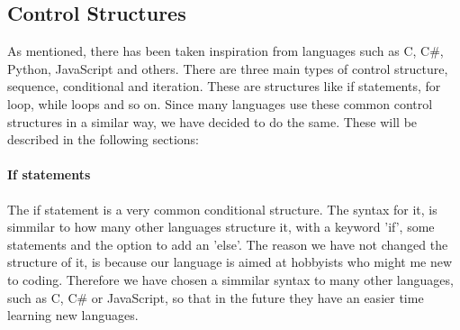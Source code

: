 \subsection{Control Structures}
As mentioned, there has been taken inspiration from languages such as C, C\#, Python, JavaScript and others. There are three main types of control structure, sequence, conditional and iteration. These are structures like if statements, for loop, while loops and so on. Since many languages use these common control structures in a similar way, we have decided to do the same. These will be described in the following sections:

\paragraph*{If statements}
The if statement is a very common conditional structure. The syntax for it, is simmilar to how many other languages structure it, with a keyword 'if', some statements and the option to add an 'else'. The reason we have not changed the structure of it, is because our language is aimed at hobbyists who might me new to coding. Therefore we have chosen a simmilar syntax to many other languages, such as C, C\# or JavaScript, so that in the future they have an easier time learning new languages.





